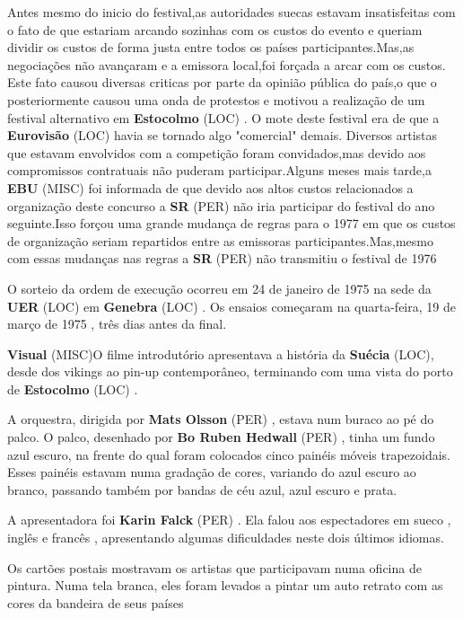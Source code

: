 \documentclass[12pt,a4paper]{article}
\begin{document}
Antes mesmo do inicio do festival,as autoridades suecas estavam insatisfeitas com o fato de que estariam arcando sozinhas com os custos do evento e queriam dividir os custos de forma justa entre todos os países participantes.Mas,as negociações não avançaram e a emissora local,foi forçada a arcar com os custos. Este fato causou diversas criticas por parte da opinião pública do país,o que o posteriormente causou uma onda de protestos e motivou a realização de um festival alternativo em \textbf{Estocolmo} (LOC) . O mote deste festival era de que a \textbf{Eurovisão} (LOC) havia se tornado algo "comercial" demais. Diversos artistas que estavam envolvidos com a competição foram convidados,mas devido aos compromissos contratuais não puderam participar.Alguns meses mais tarde,a \textbf{EBU} (MISC) foi informada de que devido aos altos custos relacionados a organização deste concurso a \textbf{SR} (PER) não iria participar do festival do ano seguinte.Isso forçou uma grande mudança de regras para o 1977 em que os custos de organização seriam repartidos entre as emissoras participantes.Mas,mesmo com essas mudanças nas regras a \textbf{SR} (PER) não transmitiu o festival de 1976

O sorteio da ordem de execução ocorreu em 24 de janeiro de 1975 na sede da \textbf{UER} (LOC) em \textbf{Genebra} (LOC) . Os ensaios começaram na quarta-feira, 19 de março de 1975 , três dias antes da final.



\textbf{Visual} (MISC)O filme introdutório apresentava a história da \textbf{Suécia} (LOC), desde dos vikings ao pin-up contemporâneo, terminando com uma vista do porto de \textbf{Estocolmo} (LOC) .

A orquestra, dirigida por \textbf{Mats Olsson} (PER) , estava num buraco ao pé do palco. O palco, desenhado por \textbf{Bo Ruben Hedwall} (PER) , tinha um fundo azul escuro, na frente do qual foram colocados cinco painéis móveis trapezoidais. Esses painéis estavam numa gradação de cores, variando do azul escuro ao branco, passando também por bandas de céu azul, azul escuro e prata.

A apresentadora foi \textbf{Karin Falck} (PER) . Ela falou aos espectadores em sueco , inglês e francês , apresentando algumas dificuldades neste dois últimos idiomas.

Os cartões postais mostravam os artistas que participavam numa oficina de pintura. Numa tela branca, eles foram levados a pintar um auto retrato com as cores da bandeira de seus países
\end{document}
